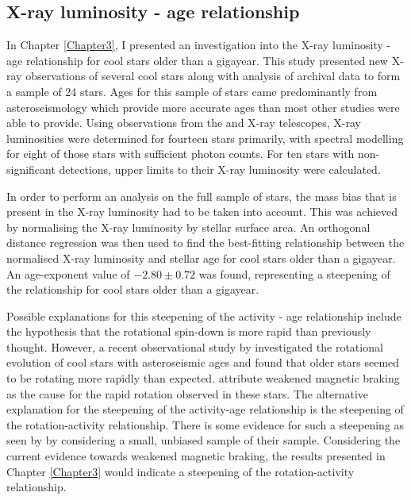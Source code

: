 \subsection{X-ray luminosity - age relationship}

In Chapter \ref{Chapter3}, I presented an investigation into the X-ray luminosity - age relationship for cool stars older than a gigayear. This study presented new X-ray observations of several cool stars along with analysis of archival data to form a sample of 24 stars. Ages for this sample of stars came predominantly from asteroseismology which provide more accurate ages than most other studies were able to provide. Using observations from the \Chandra and \XMM X-ray telescopes, X-ray luminosities were determined for fourteen stars primarily, with spectral modelling for eight of those stars with sufficient photon counts. For ten stars with non-significant detections, upper limits to their X-ray luminosity were calculated.

In order to perform an analysis on the full sample of stars, the mass bias that is present in the X-ray luminosity had to be taken into account. This was achieved by normalising the X-ray luminosity by stellar surface area. An orthogonal distance regression was then used to find the best-fitting relationship between the normalised X-ray luminosity and stellar age for cool stars older than a gigayear. An age-exponent value of $-2.80 \pm 0.72$ was found, representing a steepening of the relationship for cool stars older than a gigayear.

Possible explanations for this steepening of the activity - age relationship include the hypothesis that the rotational spin-down is more rapid than previously thought. However, a recent observational study by \citealt{van_Saders_etal_2016} investigated the rotational evolution of cool stars with asteroseismic ages and found that older stars seemed to be rotating more rapidly than expected. \citet{van_Saders_etal_2016} attribute weakened magnetic braking as the cause for the rapid rotation observed in these stars. The alternative explanation for the steepening of the activity-age relationship is the steepening of the rotation-activity relationship. There is some evidence for such a steepening as seen by \citet{Wright_etal_2011} by considering a small, unbiased sample of their sample. Considering the current evidence towards weakened magnetic braking, the results presented in Chapter \ref{Chapter3} would indicate a steepening of the rotation-activity relationship.

